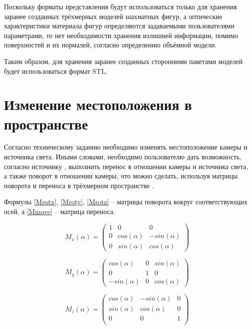 Поскольку форматы представления будут использоваться только для хранения заранее созданных трёхмерных моделей шахматных фигур, а оптические характеристики материала фигур определяются задаваемыми пользователями параметрами, то нет необходимости хранения излишней информации, помимо поверхностей и их нормалей, согласно определению объёмной модели. 

Таким образом, для хранения заранее созданных сторонними пакетами моделей будет использоваться формат STL.

\section{Изменение местоположения в пространстве}

Согласно техническому заданию необходимо изменять местоположение камеры и источника света. Иными словами, необходимо пользователю дать возможность, согласно источнику \cite{kurov:2023}, выполнить перенос в отношении камеры и источника света, а также поворот в отношении камеры, что можно сделать, используя матрицы поворота и переноса в трёхмерном пространстве \cite{kurov:2023}.

Формулы \ref{Mrotx}, \ref{Mroty}, \ref{Mrotz} -- матрицы поворота вокруг соответствующих осей, а \ref{Mmove} -- матрица переноса.

\begin{equation}
	\label{Mrotx}
	M_x(\alpha) = 
	\begin{pmatrix}
		1 & 0 & 0 \\
		0 & cos(\alpha) & -sin(\alpha) \\
		0 & sin(\alpha) & cos(\alpha) 
	\end{pmatrix}
\end{equation}

\begin{equation}
	\label{Mroty}
	M_y(\alpha) = 
	\begin{pmatrix}
		cos(\alpha) & 0 & sin(\alpha) \\
		0 & 1 & 0 \\
		-sin(\alpha) & 0 & cos(\alpha) 
	\end{pmatrix}
\end{equation}

\begin{equation}
	\label{Mrotz}
	M_z(\alpha) = 
	\begin{pmatrix}
		cos(\alpha) & -sin(\alpha) & 0 \\
		sin(\alpha) & cos(\alpha) & 0 \\
		0 & 0 & 1 \\ 
	\end{pmatrix}
\end{equation}

